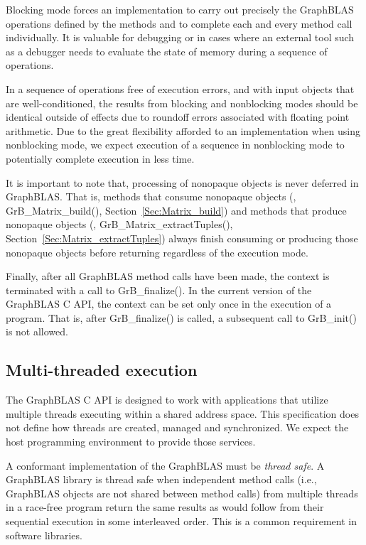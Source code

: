 Blocking mode forces an implementation to carry out precisely the
GraphBLAS operations defined by the methods and to complete each and
every method call individually.  It is valuable for debugging or in
cases where an external tool such as a debugger needs to evaluate the
state of memory during a sequence of operations.

In a sequence of operations free of execution errors, and with input
objects that are well-conditioned, the results from blocking and
nonblocking modes should be identical outside of effects due to roundoff
errors associated with floating point arithmetic.  Due to the great
flexibility afforded to an implementation when using nonblocking mode,
we expect execution of a sequence in nonblocking mode to potentially
complete execution in less time.

It is important to note that, processing of nonopaque objects is never deferred in
GraphBLAS. That is, methods that consume nonopaque objects (\eg, {\sf
GrB\_Matrix\_build()}, Section~\ref{Sec:Matrix_build}) and methods that
produce nonopaque objects (\eg, {\sf GrB\_Matrix\_extractTuples()},
Section~\ref{Sec:Matrix_extractTuples}) always finish consuming or
producing those nonopaque objects before returning regardless of the 
execution mode.

Finally, after all GraphBLAS method calls have been made, the context is terminated
with a call to {\sf GrB\_finalize()}.  In the current version of the
GraphBLAS C API, the context can be set only once in the execution of
a program. That is, after {\sf GrB\_finalize()} is called, a subsequent
call to {\sf GrB\_init()} is not allowed.


\subsection{Multi-threaded execution}
\label{Sec:MultiThread}

The GraphBLAS C API is designed to work with applications that
utilize multiple threads executing within a shared address space.
This specification does not define how threads are created, managed and
synchronized.  We expect the host programming environment to provide
those services. 

A conformant implementation of the GraphBLAS must be \emph{thread safe}.  A 
GraphBLAS library is thread safe when independent method calls (i.e., GraphBLAS 
objects are not shared between method calls) from multiple threads in a race-free 
program return the same results as would follow from their sequential execution 
in some interleaved order.   This is a common requirement in software libraries. 

